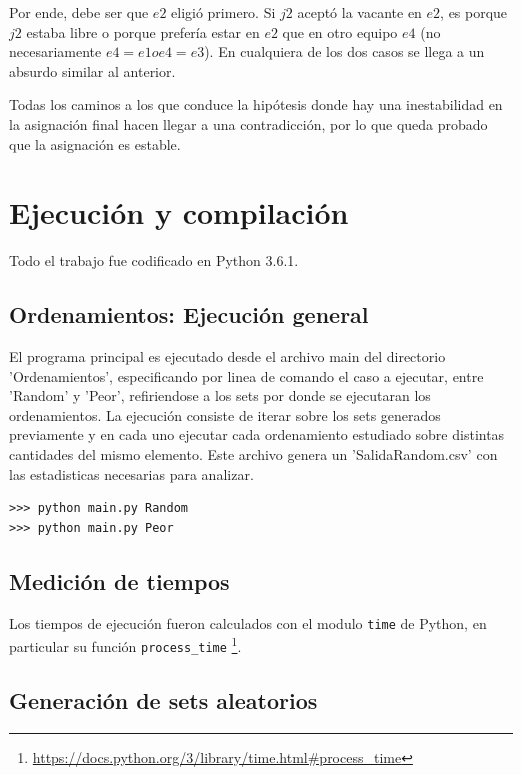 \documentclass[article,a4paper]{article}
\begin{document}
Por ende, debe ser que $e2$ eligió primero. Si $j2$ aceptó la vacante en $e2$, es porque $j2$ estaba libre o porque prefería estar en $e2$ que en otro equipo $e4$ (no necesariamente $e4 = e1 o e4 = e3$). En cualquiera de los dos casos se llega a un absurdo similar al anterior.

Todas los caminos a los que conduce la hipótesis donde hay una inestabilidad en la asignación final hacen llegar a una contradicción, por lo que queda probado que la asignación es estable.


\newpage
\appendix

\section{Ejecución y compilación}

Todo el trabajo fue codificado en Python 3.6.1. 

\subsection{Ordenamientos: Ejecución general}

El programa principal es ejecutado desde el archivo main del directorio 'Ordenamientos', especificando por linea de comando el caso a ejecutar, entre 'Random' y 'Peor', refiriendose a los sets por donde se ejecutaran los ordenamientos. La ejecución consiste de iterar sobre los sets generados previamente y en cada uno ejecutar cada ordenamiento estudiado sobre distintas cantidades del mismo elemento. Este archivo genera un 'SalidaRandom.csv' con las estadisticas necesarias para analizar.

\begin{verbatim}
>>> python main.py Random
>>> python main.py Peor
\end{verbatim}

\subsection{Medición de tiempos}
 Los tiempos de ejecución fueron calculados con el modulo \texttt{time} de Python, en particular su función \texttt{process\_time} \footnote{\url{https://docs.python.org/3/library/time.html\#process\_time}}.

\subsection{Generación de sets aleatorios}
\end{document}
